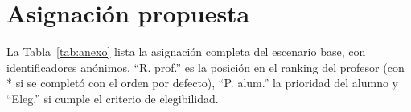 \documentclass{article}
\begin{document}
\section{Asignación propuesta}

La Tabla~\ref{tab:anexo} lista la asignación completa del escenario base, con identificadores anónimos. ``R. prof.'' es la posición en el ranking del profesor (con * si se completó con el orden por defecto), ``P. alum.'' la prioridad del alumno y ``Eleg.'' si cumple el criterio de elegibilidad.

{\small

}
\end{document}

